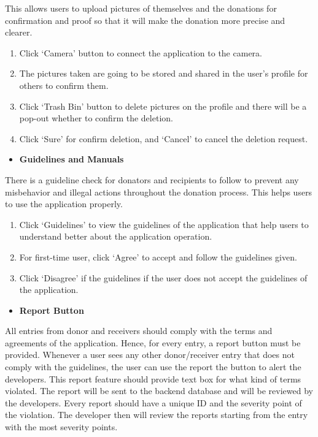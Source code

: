 \documentclass[conference]{IEEEtran}
\begin{document}
\par This allows users to upload pictures of themselves and the donations for confirmation and proof so that it will make the donation more precise and clearer.
\begin{enumerate}
\item  Click ‘Camera’ button to connect the application to the camera.
\item  The pictures taken are going to be stored and shared in the user’s profile for others to confirm them.
\item  Click ‘Trash Bin’ button to delete pictures on the profile and there will be a pop-out whether to confirm the deletion.
\item  Click ‘Sure’ for confirm deletion, and ‘Cancel’ to cancel the deletion request. \\
\end{enumerate}
\begin{itemize}
\item \textbf{Guidelines and Manuals}
\end{itemize}
\par There is a guideline check for donators and recipients to follow to prevent any misbehavior and illegal actions throughout the donation process. This helps users to use the application properly.
\begin{enumerate}
\item  Click ‘Guidelines’ to view the guidelines of the application that help users to understand better about the application operation. 
\item  For first-time user, click ‘Agree’ to accept and follow the guidelines given. 
\item  Click ‘Disagree’ if the guidelines if the user does not accept the guidelines of the application. \\
\end{enumerate}
\begin{itemize}
\item \textbf{Report Button}
\end{itemize}
\par All entries from donor and receivers should comply with the terms and agreements of the application. Hence, for every entry, a report button must be provided. Whenever a user sees any other donor/receiver entry that does not comply with the guidelines, the user can use the report the button to alert the developers. This report feature should provide text box for what kind of terms violated. The report will be sent to the backend database and will be reviewed by the developers. Every report should have a unique ID and the severity point of the violation. The developer then will review the reports starting from the entry with the most severity points.  \\
\end{document}
